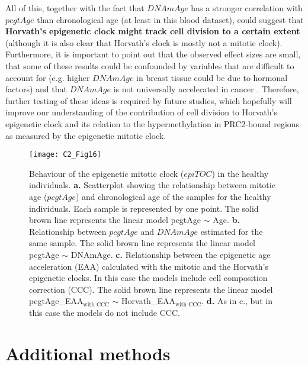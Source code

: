 \bigskip

All of this, together with the fact that $DNAmAge$ has a stronger correlation with $pcgtAge$ than chronological age (at least in this blood dataset), could suggest that \textbf{Horvath's epigenetic clock might track cell division to a certain extent} (although it is also clear that Horvath's clock is mostly not a mitotic clock). Furthermore, it is important to point out that the observed effect sizes are small, that some of these results could be confounded by variables that are difficult to account for (e.g. higher $DNAmAge$ in breast tissue could be due to hormonal factors) and that $DNAmAge$ is not universally accelerated in cancer \citep{Horvath2015e}. Therefore, further testing of these ideas is required by future studies, which hopefully will improve our understanding of the contribution of cell division to Horvath's epigenetic clock and its relation to the hypermethylation in PRC2-bound regions as measured by the epigenetic mitotic clock.    


\begin{figure}[htbp!] 
	\centering
	\texttt{[image: C2\_Fig16]}
	\vspace*{2mm}    
	\caption[Behaviour of the epigenetic mitotic clock ($epiTOC$) in the healthy individuals]{Behaviour of the epigenetic mitotic clock ($epiTOC$) in the healthy individuals. \textbf{a.} Scatterplot showing the relationship between mitotic age ($pcgtAge$) \citep{Yang2016} and chronological age of the samples for the healthy individuals. Each sample is represented by one point. The solid brown line represents the linear model pcgtAge $\sim$ Age. \textbf{b.} Relationship between $pcgtAge$ and $DNAmAge$ estimated for the same sample. The solid brown line represents the linear model pcgtAge $\sim$ DNAmAge. \textbf{c.} Relationship between the epigenetic age acceleration (EAA) calculated with the mitotic and the Horvath's epigenetic clocks. In this case the models include cell composition correction (CCC). The solid brown line represents the linear model pcgtAge\_EAA$_{\text{with CCC}}$ $\sim$ Horvath\_EAA$_{\text{with CCC}}$. \textbf{d.} As in c., but in this case the models do not include CCC.}
	\label{fig:c2_fig16}
\end{figure}


\section{Additional methods} \label{s:2.4}

